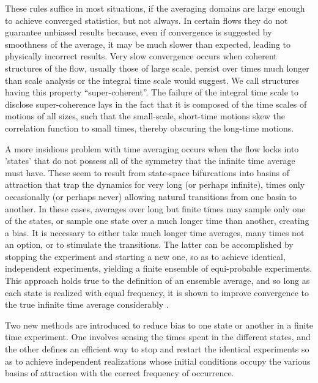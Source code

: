 \documentclass[twocolumn,10pt]{tsfp}
\begin{document}
  These rules suffice in most situations, if the averaging domains are large enough to achieve converged statistics, but not always. In certain flows they do not guarantee unbiased results because, even if convergence is suggested by smoothness of the average, it may be much slower than expected, leading to physically incorrect results. Very slow convergence occurs when coherent structures of the flow, usually those of large scale, persist over times much longer than scale analysis or the integral time scale would suggest. We call structures having this property ``super-coherent''. The failure of the integral time scale to disclose super-coherence lays in the fact that it is composed of the time scales of motions of all sizes, such that the small-scale, short-time motions skew the correlation function to small times, thereby obscuring the long-time motions. 
 
A more insidious problem with time averaging occurs when the flow locks into 'states' that do not possess all of the symmetry that the infinite time average must have. These seem to result from state-space bifurcations into basins of attraction that trap the dynamics for very long (or perhaps infinite), times only occasionally (or perhaps never) allowing natural transitions from one basin to another. In these cases, averages over long but finite times may sample only one of the states, or sample one state over a much longer time than another, creating a bias. It is necessary to either take much longer time averages, many times not an option, or to stimulate the transitions. The latter can be accomplished by stopping the experiment and starting a new one, so as to achieve identical, independent experiments, yielding a finite ensemble of equi-probable experiments. This approach holds true to the definition of an ensemble average, and so long as each state is realized with equal frequency, it is shown to improve convergence to the true infinite time average considerably \citep{fernandes2001spatial}. 

    Two new methods are introduced to reduce bias to one state or another in a finite time experiment. One involves sensing the times spent in the different states, and the other defines an efficient way to stop and restart the identical experiments so as to achieve independent realizations whose initial conditions occupy the various basins of attraction with the correct frequency of occurrence.
\end{document}
